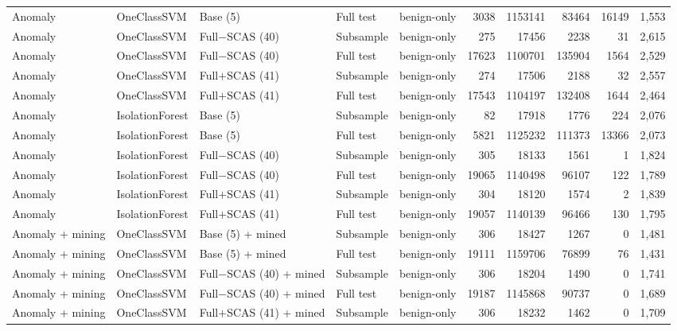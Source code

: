 \begin{longtable}{lllllrrrrr}
\addlinespace
Anomaly & OneClassSVM & Base (5) & Full test & benign-only & 3038 & 1153141 & 83464 & 16149 & 1,553 \\
\addlinespace
Anomaly & OneClassSVM & Full$-$SCAS (40) & Subsample & benign-only & 275 & 17456 & 2238 & 31 & 2,615 \\
\addlinespace
Anomaly & OneClassSVM & Full$-$SCAS (40) & Full test & benign-only & 17623 & 1100701 & 135904 & 1564 & 2,529 \\
\addlinespace
Anomaly & OneClassSVM & Full$+$SCAS (41) & Subsample & benign-only & 274 & 17506 & 2188 & 32 & 2,557 \\
\addlinespace
Anomaly & OneClassSVM & Full$+$SCAS (41) & Full test & benign-only & 17543 & 1104197 & 132408 & 1644 & 2,464 \\
\addlinespace
Anomaly & IsolationForest & Base (5) & Subsample & benign-only & 82 & 17918 & 1776 & 224 & 2,076 \\
\addlinespace
Anomaly & IsolationForest & Base (5) & Full test & benign-only & 5821 & 1125232 & 111373 & 13366 & 2,073 \\
\addlinespace
Anomaly & IsolationForest & Full$-$SCAS (40) & Subsample & benign-only & 305 & 18133 & 1561 & 1 & 1,824 \\
\addlinespace
Anomaly & IsolationForest & Full$-$SCAS (40) & Full test & benign-only & 19065 & 1140498 & 96107 & 122 & 1,789 \\
\addlinespace
Anomaly & IsolationForest & Full$+$SCAS (41) & Subsample & benign-only & 304 & 18120 & 1574 & 2 & 1,839 \\
\addlinespace
Anomaly & IsolationForest & Full$+$SCAS (41) & Full test & benign-only & 19057 & 1140139 & 96466 & 130 & 1,795 \\
\addlinespace
Anomaly + mining & OneClassSVM & Base (5) + mined & Subsample & benign-only & 306 & 18427 & 1267 & 0 & 1,481 \\
\addlinespace
Anomaly + mining & OneClassSVM & Base (5) + mined & Full test & benign-only & 19111 & 1159706 & 76899 & 76 & 1,431 \\
\addlinespace
Anomaly + mining & OneClassSVM & Full$-$SCAS (40) + mined & Subsample & benign-only & 306 & 18204 & 1490 & 0 & 1,741 \\
\addlinespace
Anomaly + mining & OneClassSVM & Full$-$SCAS (40) + mined & Full test & benign-only & 19187 & 1145868 & 90737 & 0 & 1,689 \\
\addlinespace
Anomaly + mining & OneClassSVM & Full$+$SCAS (41) + mined & Subsample & benign-only & 306 & 18232 & 1462 & 0 & 1,709 \\

\end{longtable}
